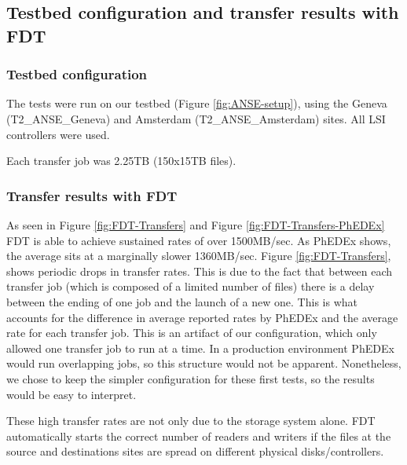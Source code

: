\subsection{Testbed configuration and transfer results with FDT}

\subsubsection{Testbed configuration}

The tests were run on our testbed (Figure \ref{fig:ANSE-setup}), using the Geneva
(T2\_ANSE\_Geneva) and Amsterdam (T2\_ANSE\_Amsterdam) sites. All LSI controllers
were used.

Each transfer job was 2.25TB (150x15TB files).

\subsubsection{Transfer results with FDT}

As seen in Figure \ref{fig:FDT-Transfers} and Figure \ref{fig:FDT-Transfers-PhEDEx}
FDT is able to achieve sustained rates of over 1500MB/sec. As PhEDEx shows,
the average sits at a marginally slower 1360MB/sec. Figure \ref{fig:FDT-Transfers}, shows periodic drops in transfer rates.
This is due to the fact that between each transfer job (which is composed of a limited
number of files) there is a delay between the ending of one job and the launch of
a new one. This is what accounts for the difference in average reported rates by PhEDEx
and the average rate for each transfer job. This is an artifact of our configuration, which only allowed one
transfer job to run at a time. In a production environment PhEDEx would run overlapping jobs, so this structure would not be apparent. Nonetheless, we chose to keep the simpler configuration for these first tests, so the results would be easy to interpret.

These high transfer rates are not only due to the storage system alone. FDT
automatically starts the correct number of readers and writers if the files at 
the source and destinations sites are spread on different physical disks/controllers.

